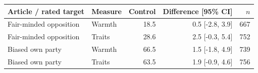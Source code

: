 \begin{tabular}{llrrr}
\toprule
Article / rated target & Measure & Control & Difference [95\% CI] & $n$ \\
\midrule
Fair-minded opposition & Warmth & 18.5 & 0.5 [-2.8, 3.9] & 667 \\
Fair-minded opposition & Traits & 28.6 & 2.5 [-0.3, 5.4] & 752 \\
Biased own party & Warmth & 66.5 & 1.5 [-1.8, 4.9] & 739 \\
Biased own party & Traits & 63.5 & 1.9 [-0.9, 4.6] & 756 \\
\bottomrule
\end{tabular}
